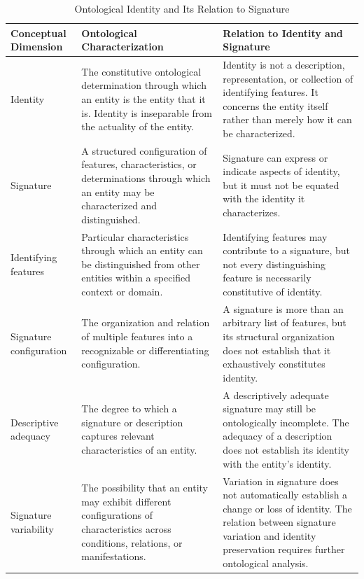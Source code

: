 
\begin{table}[htbp]
    \centering
    \caption{Ontological Identity and Its Relation to Signature}
    \label{tab:identity-and-signature}

    \renewcommand{\arraystretch}{1.4}
    \begin{tabular}{p{3.2cm} p{5.1cm} p{5.3cm}}
        \hline
        \textbf{Conceptual Dimension} &
        \textbf{Ontological Characterization} &
        \textbf{Relation to Identity and Signature} \\
        \hline

        Identity &
        The constitutive ontological determination through which an entity is the entity that it is. Identity is inseparable from the actuality of the entity. &
        Identity is not a description, representation, or collection of identifying features. It concerns the entity itself rather than merely how it can be characterized. \\

        Signature &
        A structured configuration of features, characteristics, or determinations through which an entity may be characterized and distinguished. &
        Signature can express or indicate aspects of identity, but it must not be equated with the identity it characterizes. \\

        Identifying features &
        Particular characteristics through which an entity can be distinguished from other entities within a specified context or domain. &
        Identifying features may contribute to a signature, but not every distinguishing feature is necessarily constitutive of identity. \\

        Signature configuration &
        The organization and relation of multiple features into a recognizable or differentiating configuration. &
        A signature is more than an arbitrary list of features, but its structural organization does not establish that it exhaustively constitutes identity. \\

        Descriptive adequacy &
        The degree to which a signature or description captures relevant characteristics of an entity. &
        A descriptively adequate signature may still be ontologically incomplete. The adequacy of a description does not establish its identity with the entity's identity. \\

        Signature variability &
        The possibility that an entity may exhibit different configurations of characteristics across conditions, relations, or manifestations. &
        Variation in signature does not automatically establish a change or loss of identity. The relation between signature variation and identity preservation requires further ontological analysis. \\


\end{tabular}
\end{table}
